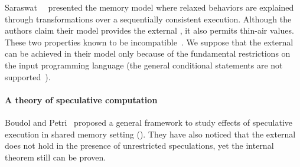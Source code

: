 Saraswat~\etal~\cite{Saraswat-al:PPoPP07} presented the \RAO memory model
where relaxed behaviors are explained through transformations 
over a sequentially consistent execution.
Although the authors claim their model provides the external \DRF,
it also permits thin-air values. 
These two properties known to be incompatible~\cite{Batty-al:ESOP15}.
We suppose that the external \DRF can be achieved in their model 
only because of the fundamental restrictions on the input programming language 
(\eg the general conditional statements are not supported~\cite{PichonPharabod-Sewell:POPL16}). 

\paragraph{A theory of speculative computation}

Boudol and Petri~\cite{Boudol-Petri:ESOP10} proposed a general 
framework to study effects of speculative execution in
shared memory setting (\TSC). 
They have also noticed that the external \DRF does not 
hold in the presence of unrestricted speculations, 
yet the internal \DRF theorem still can be proven. 
